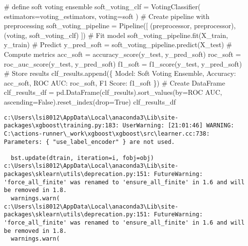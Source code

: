 \documentclass[
  letterpaper,
  DIV=11,
  numbers=noendperiod]{scrreprt}
\newenvironment{Shaded}{\begin{snugshade}}{\end{snugshade}}
\newcommand{\CommentTok}[1]{\textcolor[rgb]{0.37,0.37,0.37}{#1}}
\newcommand{\NormalTok}[1]{\textcolor[rgb]{0.00,0.23,0.31}{#1}}
\newcommand{\OperatorTok}[1]{\textcolor[rgb]{0.37,0.37,0.37}{#1}}
\newcommand{\StringTok}[1]{\textcolor[rgb]{0.13,0.47,0.30}{#1}}
\newcommand{\VariableTok}[1]{\textcolor[rgb]{0.07,0.07,0.07}{#1}}
\begin{document}
\begin{Shaded}
\begin{Highlighting}[]
\CommentTok{\# define soft voting ensemble}
\NormalTok{soft\_voting\_clf }\OperatorTok{=}\NormalTok{ VotingClassifier(}
\NormalTok{    estimators}\OperatorTok{=}\NormalTok{voting\_estimators,}
\NormalTok{    voting}\OperatorTok{=}\StringTok{\textquotesingle{}soft\textquotesingle{}}
\NormalTok{)}
\CommentTok{\# Create pipeline with preprocessing}
\NormalTok{soft\_voting\_pipeline }\OperatorTok{=}\NormalTok{ Pipeline([}
\NormalTok{    (}\StringTok{\textquotesingle{}preprocessor\textquotesingle{}}\NormalTok{, preprocessor),}
\NormalTok{    (}\StringTok{\textquotesingle{}voting\textquotesingle{}}\NormalTok{, soft\_voting\_clf)}
\NormalTok{])}
\CommentTok{\# Fit model}
\NormalTok{soft\_voting\_pipeline.fit(X\_train, y\_train)}
\CommentTok{\# Predict}
\NormalTok{y\_pred\_soft }\OperatorTok{=}\NormalTok{ soft\_voting\_pipeline.predict(X\_test)}
\CommentTok{\# Compute metrics}
\NormalTok{acc\_soft }\OperatorTok{=}\NormalTok{ accuracy\_score(y\_test, y\_pred\_soft)}
\NormalTok{roc\_soft }\OperatorTok{=}\NormalTok{ roc\_auc\_score(y\_test, y\_pred\_soft)}
\NormalTok{f1\_soft }\OperatorTok{=}\NormalTok{ f1\_score(y\_test, y\_pred\_soft)}
\CommentTok{\# Store results}
\NormalTok{clf\_results.append(\{}
    \StringTok{\textquotesingle{}Model\textquotesingle{}}\NormalTok{: }\StringTok{\textquotesingle{}Soft Voting Ensemble\textquotesingle{}}\NormalTok{,}
    \StringTok{\textquotesingle{}Accuracy\textquotesingle{}}\NormalTok{: acc\_soft,}
    \StringTok{\textquotesingle{}ROC AUC\textquotesingle{}}\NormalTok{: roc\_soft,}
    \StringTok{\textquotesingle{}F1 Score\textquotesingle{}}\NormalTok{: f1\_soft}
\NormalTok{\})}
\CommentTok{\# Create DataFrame}
\NormalTok{clf\_results\_df }\OperatorTok{=}\NormalTok{ pd.DataFrame(clf\_results).sort\_values(by}\OperatorTok{=}\StringTok{\textquotesingle{}ROC AUC\textquotesingle{}}\NormalTok{, ascending}\OperatorTok{=}\VariableTok{False}\NormalTok{).reset\_index(drop}\OperatorTok{=}\VariableTok{True}\NormalTok{)}
\NormalTok{clf\_results\_df}

\end{Highlighting}
\end{Shaded}

\begin{verbatim}
c:\Users\lsi8012\AppData\Local\anaconda3\Lib\site-packages\xgboost\training.py:183: UserWarning: [21:01:46] WARNING: C:\actions-runner\_work\xgboost\xgboost\src\learner.cc:738: 
Parameters: { "use_label_encoder" } are not used.

  bst.update(dtrain, iteration=i, fobj=obj)
c:\Users\lsi8012\AppData\Local\anaconda3\Lib\site-packages\sklearn\utils\deprecation.py:151: FutureWarning: 'force_all_finite' was renamed to 'ensure_all_finite' in 1.6 and will be removed in 1.8.
  warnings.warn(
c:\Users\lsi8012\AppData\Local\anaconda3\Lib\site-packages\sklearn\utils\deprecation.py:151: FutureWarning: 'force_all_finite' was renamed to 'ensure_all_finite' in 1.6 and will be removed in 1.8.
  warnings.warn(
\end{verbatim}
\end{document}
